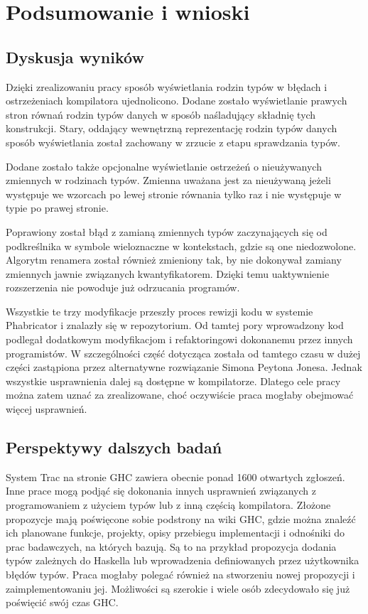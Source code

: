 \chapter{Podsumowanie i wnioski}\label{chap:podsumowanie}

\section{Dyskusja wyników}

Dzięki zrealizowaniu pracy sposób wyświetlania rodzin typów w błędach i ostrzeżeniach kompilatora ujednolicono. Dodane zostało wyświetlanie prawych stron równań rodzin typów danych w sposób naśladujący składnię tych konstrukcji. Stary, oddający wewnętrzną reprezentację rodzin typów danych sposób wyświetlania został zachowany w zrzucie z etapu sprawdzania typów.

Dodane zostało także opcjonalne wyświetlanie ostrzeżeń o nieużywanych zmiennych w rodzinach typów. Zmienna uważana jest za nieużywaną jeżeli występuje we wzorcach po lewej stronie równania tylko raz i nie występuje w typie po prawej stronie.

Poprawiony został błąd z zamianą zmiennych typów zaczynających się od podkreślnika w symbole wieloznaczne w kontekstach, gdzie są one niedozwolone. Algorytm renamera został również zmieniony tak, by nie dokonywał zamiany zmiennych jawnie związanych kwantyfikatorem. Dzięki temu uaktywnienie rozszerzenia  nie powoduje już odrzucania programów.

Wszystkie te trzy modyfikacje przeszły proces rewizji kodu w systemie Phabricator i znalazły się w repozytorium. Od tamtej pory wprowadzony kod podlegał dodatkowym modyfikacjom i refaktoringowi dokonanemu przez innych programistów. W szczególności część dotycząca  została od tamtego czasu w dużej części zastąpiona przez alternatywne rozwiązanie Simona Peytona Jonesa. Jednak wszystkie usprawnienia dalej są dostępne w kompilatorze. Dlatego cele pracy można zatem uznać za zrealizowane, choć oczywiście praca mogłaby obejmować więcej usprawnień.

\section{Perspektywy dalszych badań}
System Trac na stronie GHC zawiera obecnie ponad 1600 otwartych zgłoszeń\cite{WikiTickets}. Inne prace mogą podjąć się dokonania innych usprawnień związanych z programowaniem z użyciem typów lub z inną częścią kompilatora. Złożone propozycje mają poświęcone sobie podstrony na wiki GHC, gdzie można znaleźć ich planowane funkcje, projekty, opisy przebiegu implementacji i odnośniki do prac badawczych, na których bazują. Są to na przykład propozycja dodania typów zależnych do Haskella lub wprowadzenia definiowanych przez użytkownika błędów typów. Praca mogłaby polegać również na stworzeniu nowej propozycji i zaimplementowaniu jej. Możliwości są szerokie i wiele osób zdecydowało się już poświęcić swój czas GHC.

